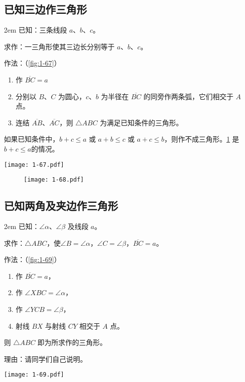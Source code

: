 \subsection{已知三边作三角形}


\noindent
\begin{minipage}{0.7\linewidth}\parindent2em
	已知：三条线段 $a$、$b$、$c$。

	求作：一三角形使其三边长分别等于 $a$、$b$、$c$。

	作法：（\cref{fig:1-67}）
	\begin{enumerate}
		\item 作 $\overline{BC}=a$
		\item 分别以 $B$、$C$ 为圆心，$c$、$b$ 为半径在 $\overline{BC}$ 的同旁作两条弧，它们相交于 $A$ 点。
		\item 连结 $\overline{AB}$、$\overline{AC}$，则 $\triangle ABC$ 为满足已知条件的三角形。
	\end{enumerate}

  \begin{rmk}
		如果已知条件中，$b+c\leqslant a$ 或 $a+b\leqslant c$ 或 $a+c\leqslant b$，则作不成三角形。\cref{fig:1-68} 是$b+c\le a$的情况。
		\end{rmk}
\end{minipage}%
\begin{minipage}{0.3\linewidth}\centering
	\texttt{[image: 1-67.pdf]}
	\label{fig:1-67}
\end{minipage}

\begin{figure}
	\texttt{[image: 1-68.pdf]}
	\caption{}\label{fig:1-68}
\end{figure}

\subsection{已知两角及夹边作三角形}
\noindent
\begin{minipage}{0.55\linewidth}\parindent2em
已知：$\angle \alpha$、$\angle \beta$ 及线段 $a$。

求作：$\triangle ABC$，使$\angle B=\angle \alpha$，$\angle C=\angle \beta$，$\overline{BC}=a$。

作法：（\cref{fig:1-69}）
\begin{enumerate}
\item 作 $\overline{BC}=a$，
\item 作 $\angle XBC=\angle \alpha$，
\item 作 $\angle YCB=\angle \beta$，
\item 射线 $BX$ 与射线 $CY$ 相交于 $A$ 点。
\end{enumerate}
则 $\triangle ABC$ 即为所求作的三角形。

理由：请同学们自己说明。
\end{minipage}\hfill
\begin{minipage}{0.4\linewidth}\centering
  \texttt{[image: 1-69.pdf]}
	\label{fig:1-69}
\end{minipage}

